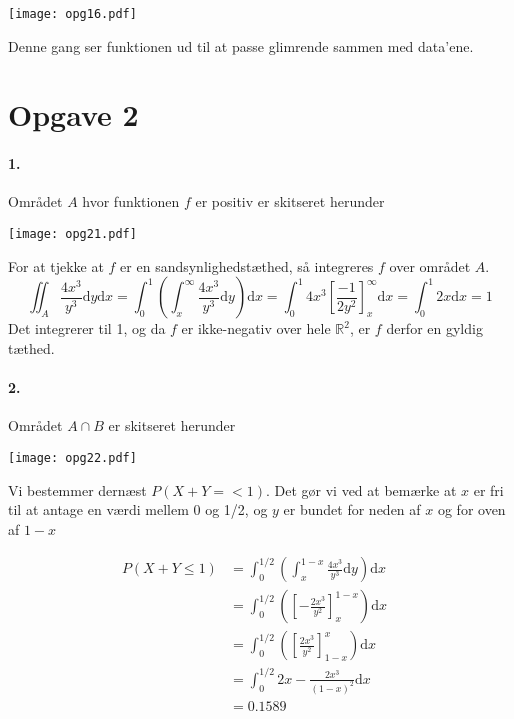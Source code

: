 \documentclass[12pt]{article}
\begin{document}
\begin{center}
  \texttt{[image: opg16.pdf]}
\end{center}

Denne gang ser funktionen ud til at passe glimrende sammen med data'ene.

\section*{Opgave 2}
\paragraph{1.}
Området $A$ hvor funktionen $f$ er positiv er skitseret herunder

\begin{center}
  \texttt{[image: opg21.pdf]}
\end{center}

For at tjekke at $f$ er en sandsynlighedstæthed, så integreres $f$ over området $A$.
\[
    \iint_A \frac{4x^3}{y^3} \mathrm{d}y\mathrm{d}x = \int_0^1 \left( \int_x^\infty \frac{4x^3}{y^3} \mathrm{d}y \right) \mathrm{d}x
    = \int_0^1 4x^3 \left[ \frac{-1}{2y^2} \right]_x^\infty \mathrm{d}x
    = \int_0^1 2x \mathrm{d}x = 1
\]
Det integrerer til 1, og da $f$ er ikke-negativ over hele $\mathbb{R}^2$, er $f$ derfor en gyldig tæthed.

\paragraph{2.}
Området $A \cap B$ er skitseret herunder

\begin{center}
  \texttt{[image: opg22.pdf]}
\end{center}

Vi bestemmer dernæst $P(X + Y =< 1)$. Det gør vi ved at bemærke at $x$ er fri til at antage en værdi mellem 0 og 1/2, og $y$ er bundet for neden af $x$ og for oven af $1 - x$

\begin{align*}
    P(X + Y \leq 1) &= \int_0^{1/2} \left( \int_x^{1 - x} \frac{4x^3}{y^3} \mathrm{d}y \right) \mathrm{d}x &\\
  &= \int_0^{1/2} \left( \left[-\frac{2x^3}{y^2} \right]_{x}^{1-x} \right) \mathrm{d}x &\\
  &= \int_0^{1/2} \left( \left[ \frac{2x^3}{y^2} \right]_{1-x}^x \right) \mathrm{d}x &\\
  &= \int_0^{1/2} 2x - \frac{2x^3}{(1-x)^2} \mathrm{d}x &\\
  &= 0.1589 &\\
\end{align*}
\end{document}
